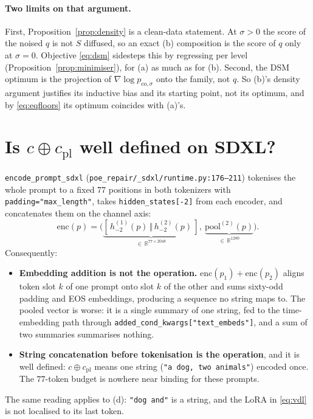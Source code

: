 \documentclass[11pt]{article}
\newcommand{\R}{\mathbb{R}}
\newcommand{\cpl}{c_{\mathrm{pl}}}
\theoremstyle{plain}
\theoremstyle{remark}
\begin{document}
\paragraph{Two limits on that argument.}
First, Proposition~\ref{prop:density} is a clean-data statement. At $\sigma > 0$ the score of
the noised $q$ is not $S$ diffused, so an exact (b) composition is the score of $q$ only at
$\sigma = 0$. Objective \eqref{eq:dsm} sidesteps this by regressing per level
(Proposition~\ref{prop:minimiser}), for (a) as much as for (b). Second, the DSM optimum is the
projection of $\nabla \log p_{\mathrm{co},\sigma}$ onto the family, not $q$. So (b)'s density
argument justifies its inductive bias and its starting point, not its optimum, and by
\eqref{eq:eqfloors} its optimum coincides with (a)'s.

\section{Is \texorpdfstring{$c \oplus \cpl$}{prompt concatenation} well defined on SDXL?}
\label{sec:concat}

\texttt{encode\_prompt\_sdxl} (\texttt{poe\_repair/\_sdxl/runtime.py:176--211}) tokenises the
whole prompt to a fixed $77$ positions in both tokenizers with \texttt{padding="max\_length"},
takes \texttt{hidden\_states[-2]} from each encoder, and concatenates them on the channel axis:
\begin{equation}
  \mathrm{enc}(p) = \Big(\underbrace{[\,h^{(1)}_{-2}(p) \,\Vert\, h^{(2)}_{-2}(p)\,]}
  _{\in\,\R^{77\times 2048}},\ \underbrace{\mathrm{pool}^{(2)}(p)}_{\in\,\R^{1280}}\Big).
\end{equation}
Consequently:
\begin{itemize}
  \item \textbf{Embedding addition is not the operation.}
    $\mathrm{enc}(p_1) + \mathrm{enc}(p_2)$ aligns token slot $k$ of one prompt onto slot $k$
    of the other and sums sixty-odd padding and EOS embeddings, producing a sequence no string
    maps to. The pooled vector is worse: it is a single summary of one string, fed to the
    time-embedding path through \texttt{added\_cond\_kwargs["text\_embeds"]}, and a sum of two
    summaries summarises nothing.
  \item \textbf{String concatenation before tokenisation is the operation}, and it is well
    defined: $c \oplus \cpl$ means one string (\texttt{"a dog, two animals"}) encoded once. The
    $77$-token budget is nowhere near binding for these prompts.
\end{itemize}
The same reading applies to (d): \texttt{"dog and"} is a string, and the LoRA in \eqref{eq:vdl}
is not localised to its last token.
\end{document}
